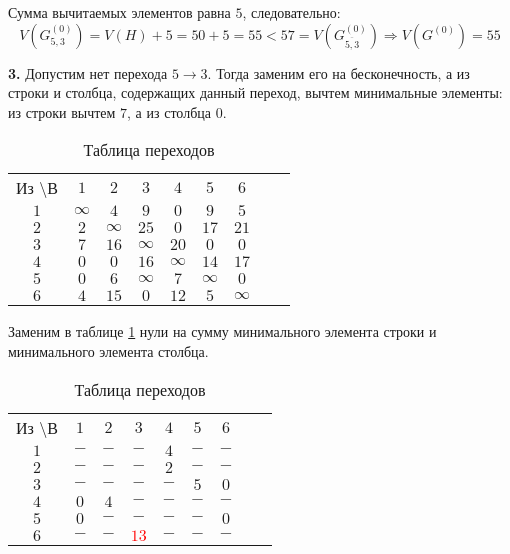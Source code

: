 Сумма вычитаемых элементов равна $5$, следовательно:
\begin{equation*}
V(G_{5,3}^{(0)}) = V(H) + 5 = 50 + 5 = 55 < 57 = V(G_{\overline{5,3}}^{(0)}) \Rightarrow V(G^{(0)}) = 55
\end{equation*}

\textbf{3.} Допустим нет перехода $5 \rightarrow 3$. Тогда заменим его на бесконечность, а из строки и столбца, содержащих данный переход, вычтем минимальные элементы: из строки вычтем $7$, а из столбца $0$.

\begin{table}[H]
\begin{center}
	\def\tabcolsep{15pt}
	\caption{Таблица переходов}
	\label{tab:8}
	\begin{tabular}{|c||c|c|c|c|c|c|c|c|}
		\hline
		Из \textbackslash В & $1$ & $2$ & $3$ & $4$ & $5$ & $6$ \\
		\hhline{|=#=|=|=|=|=|=|}
		$1$ & $\infty$ & $4$ & $9$ & $0$ & $9$ & $5$ \\
		\hline
		$2$ & $2$ & $\infty$ & $25$ & $0$ & $17$ & $21$ \\
		\hline
		$3$ & $7$ & $16$ & $\infty$ & $20$ & $0$ & $0$ \\ 
		\hline
		$4$ & $0$ & $0$ & $16$ & $\infty$ & $14$ & $17$ \\
		\hline
		$5$ & $0$ & $6$ & $\infty$ & $7$ & $\infty$ & $0$ \\
		\hline
		$6$ & $4$ & $15$ & $0$ & $12$ & $5$ & $\infty$ \\ 
		\hline
	\end{tabular}
\end{center}
\end{table}

Заменим в таблице \ref{tab:8} нули на сумму минимального элемента строки и минимального элемента столбца.

\begin{table}[H]
\begin{center}
	\def\tabcolsep{15pt}
	\caption{Таблица переходов}
	\label{tab:9}
	\begin{tabular}{|c||c|c|c|c|c|c|c|c|}
		\hline
		Из \textbackslash В & $1$ & $2$ & $3$ & $4$ & $5$ & $6$ \\
		\hhline{|=#=|=|=|=|=|=|}
		$1$ & $-$ & $-$ & $-$ & $4$ & $-$ & $-$ \\
		\hline
		$2$ & $-$ & $-$ & $-$ & $2$ & $-$ & $-$ \\
		\hline
		$3$ & $-$ & $-$ & $-$ & $-$ & $5$ & $0$ \\ 
		\hline
		$4$ & $0$ & $4$ & $-$ & $-$ & $-$ & $-$ \\
		\hline
		$5$ & $0$ & $-$ & $-$ & $-$ & $-$ & $0$ \\
		\hline
		$6$ & $-$ & $-$ & \textcolor{red}{\boldmath$13$} & $-$ & $-$ & $-$ \\ 
		\hline
	\end{tabular}
\end{center}
\end{table}

